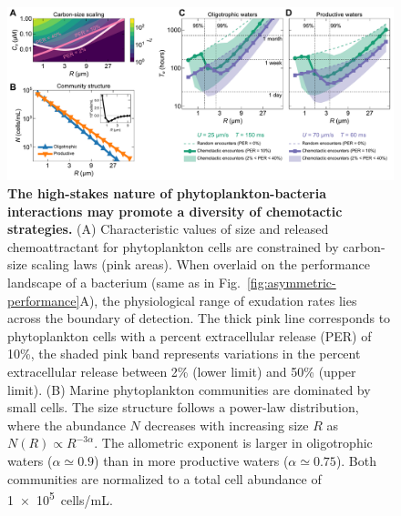 \documentclass[9pt,twocolumn,twoside]{pnas-new}
\begin{document}
\begin{figure}
    \centering
    \includegraphics[width=17.8cm]{fig5_mod.pdf}
    \caption{
        \textbf{
        The high-stakes nature of phytoplankton-bacteria interactions may promote a diversity of chemotactic strategies.
        }
        (A) Characteristic values of size and released chemoattractant for phytoplankton cells are constrained by carbon-size scaling laws (pink areas). When overlaid on the performance landscape of a bacterium (same as in Fig.~\ref{fig:asymmetric-performance}A), the physiological range of exudation rates lies across the boundary of detection.
        The thick pink line corresponds to phytoplankton cells with a percent extracellular release (PER) of 10\%, the shaded pink band represents variations in the percent extracellular release between 2\% (lower limit) and 50\% (upper limit).
        (B) Marine phytoplankton communities are dominated by small cells. The size structure follows a power-law distribution, where the abundance $N$ decreases with increasing size $R$ as $N(R) \propto R^{-3\alpha}$.
        The allometric exponent is larger in oligotrophic waters ($\alpha\simeq 0.9$) than in more productive waters ($\alpha\simeq 0.75$). Both  communities are normalized to a total cell abundance of \SI{1e5}{cells/\milli\liter}.
}
\end{figure}
\end{document}
